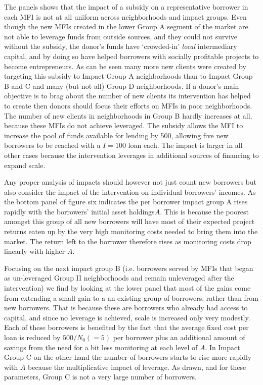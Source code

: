 \documentclass[
]{article}
\begin{document}
The panels shows that the impact of a subsidy on a representative
borrower in each MFI is not at all uniform across neighborhoods and
impact groups. Even though the new MFIs created in the lower Group A
segment of the market are not able to leverage funds from outside
sources, and they could not survive without the subsidy, the donor's
funds have `crowded-in' \emph{local} intermediary capital, and by doing
so have helped borrowers with socially profitable projects to become
entrepreneurs. As can be seen many more new clients were created by
targeting this subsidy to Impact Group A neighborhoods than to Impact
Group B and C and many (but not all) Group D neighborhoods. If a donor's
main objective is to brag about the number of new clients its
intervention has helped to create then donors should focus their efforts
on MFIs in poor neighborhoods. The number of new clients in
neighborhoods in Group B hardly increases at all, because these MFIs do
not achieve leveraged. The subsidy allows the MFI to increase the pool
of funds available for lending by 500, allowing five new borrowers to be
reached with a \(I = 100\) loan each. The impact is larger in all other
cases because the intervention leverages in additional sources of
financing to expand scale.

Any proper analysis of impacts should however not just count new
borrowers but also consider the impact of the intervention on individual
borrowers' incomes. As the bottom panel of figure six indicates the per
borrower impact group A rises rapidly with the borrowers' initial asset
holdings\(A\). This is because the poorest amongst this group of all new
borrowers will have most of their expected project returns eaten up by
the very high monitoring costs needed to bring them into the market. The
return left to the borrower therefore rises as monitoring costs drop
linearly with higher \(A\).

Focusing on the next impact group B (i.e. borrowers served by MFIs that
began as un-leveraged Group II neighborhoods and remain unleveraged
after the intervention) we find by looking at the lower panel that most
of the gains come from extending a small gain to a an existing group of
borrowers, rather than from new borrowers. That is because these are
borrowers who already had access to capital, and since no leverage is
achieved, scale is increased only very modestly. Each of these borrowers
is benefited by the fact that the average fixed cost per loan is reduced
by \(500/N_{0}( = 5)\) per borrower plus an additional amount of savings
from the need for a bit less monitoring at each level of \(A\). In
Impact Group C on the other hand the number of borrowers starts to rise
more rapidly with \(A\) because the multiplicative impact of leverage.
As drawn, and for these parameters, Group C is not a very large number
of borrowers.
\end{document}
